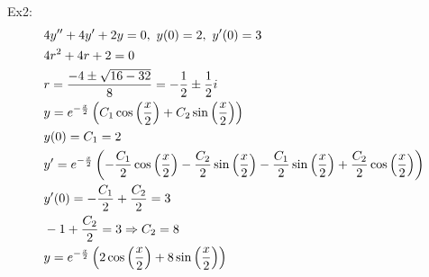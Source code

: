 \documentclass[11pt, fleqn]{article}
\begin{document}
Ex2:
\begin{align*}
    &4y''+4y'+2y=0,\ y(0)=2,\ y'(0)=3\\
    &4r^2+4r+2=0\\
    &r=\frac{-4\pm\sqrt{16-32}}{8}=-\frac{1}{2}\pm\frac{1}{2}i\\
    &y=e^{-\frac{x}{2}}\left( C_1\cos\left( \frac{x}{2} \right)+C_2\sin\left( \frac{x}{2} \right) \right)\\
    &y(0)=C_1=2\\
    &y'=e^{-\frac{x}{2}}\left( -\frac{C_1}{2}\cos\left( \frac{x}{2} \right)-\frac{C_2}{2}\sin\left( \frac{x}{2} \right)-\frac{C_1}{2}\sin\left( \frac{x}{2} \right)+\frac{C_2}{2}\cos\left( \frac{x}{2} \right) \right)\\
    &y'(0)=-\frac{C_1}{2}+\frac{C_2}{2}=3\\
    &-1+\frac{C_2}{2}=3\Rightarrow C_2=8\\
    &y=e^{-\frac{x}{2}}\left( 2\cos\left( \frac{x}{2} \right)+8\sin\left( \frac{x}{2} \right) \right)
\end{align*}
\end{document}
